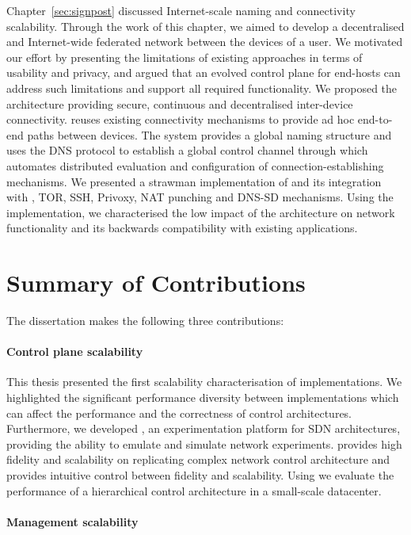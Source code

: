 Chapter~\ref{sec:signpost} discussed Internet-scale naming and connectivity
scalability.  Through the work of this chapter, we aimed to develop a
decentralised and Internet-wide federated network between the devices of a user.
We motivated our effort by presenting the limitations of existing approaches in
terms of usability and privacy, and argued that an evolved control plane for
end-hosts can address such limitations and support all required functionality.
We proposed the \signpost architecture providing secure, continuous and
decentralised inter-device connectivity. \signpost reuses existing connectivity
mechanisms to provide ad hoc end-to-end paths between devices. The system
provides a global naming structure and uses the DNS protocol to establish a
global control channel through which \signpost automates distributed evaluation
and configuration of connection-establishing mechanisms.  We presented a
strawman implementation  of \signpost and its integration with
\openvpn, TOR, SSH, Privoxy, NAT punching and DNS-SD mechanisms.  Using the
\signpost implementation, we characterised the low impact of the
architecture on network functionality and its backwards compatibility with
existing applications. 

\section{Summary of Contributions}

The dissertation makes the following three contributions:

\paragraph{Control plane scalability} 
This thesis presented the first scalability characterisation of \of
implementations. We highlighted the significant performance diversity between
implementations which can affect the performance and the correctness of control
architectures.  Furthermore, we developed \sdnsim, an experimentation platform
for SDN architectures, providing the ability to emulate and simulate network
experiments. \sdnsim provides high fidelity and scalability on replicating complex
network control architecture
and provides intuitive control between fidelity and scalability. 
Using \sdnsim we evaluate the performance of a hierarchical control architecture
in a small-scale datacenter.

\paragraph{Management scalability}

